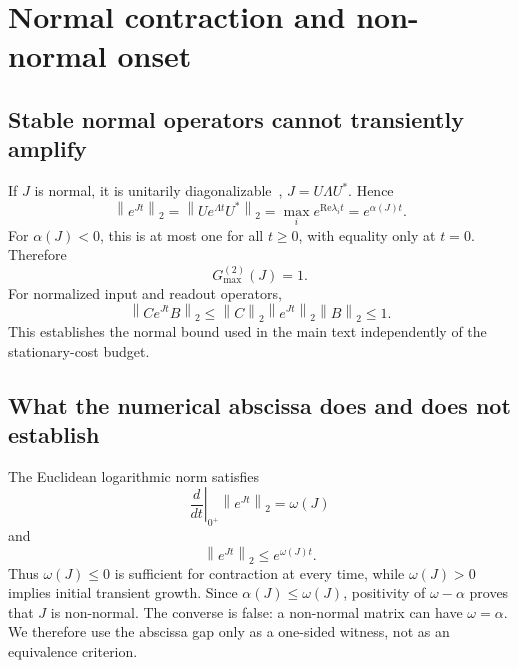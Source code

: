 \documentclass[
  aps,prl,preprint,notitlepage,superscriptaddress,nofootinbib,longbibliography,
  amsmath,amssymb
]{revtex4-2}
\newcommand{\Rey}{\mathrm{Re}}
\newcommand{\Gmax}{G_{\max}^{(2)}}
\newcommand{\opnorm}[1]{\left\lVert #1\right\rVert_2}
\begin{document}
\section{Normal contraction and non-normal onset}
\label{sec:s-normal}

\subsection{Stable normal operators cannot transiently amplify}

If $J$ is normal, it is unitarily diagonalizable~\cite{trefethen2005},
$J=U\Lambda U^\ast$. Hence
\begin{equation}
\opnorm{e^{Jt}}
=\opnorm{Ue^{\Lambda t}U^\ast}
=\max_i e^{\Rey\lambda_i t}
=e^{\alpha(J)t}.
\end{equation}
For $\alpha(J)<0$, this is at most one for all $t\ge0$, with equality only
at $t=0$. Therefore
\begin{equation}
\Gmax(J)=1.
\end{equation}
For normalized input and readout operators,
\begin{equation}
\opnorm{Ce^{Jt}B}
\le\opnorm{C}\opnorm{e^{Jt}}\opnorm{B}
\le1.
\end{equation}
This establishes the normal bound used in the main text independently of the
stationary-cost budget.

\subsection{What the numerical abscissa does and does not establish}

The Euclidean logarithmic norm satisfies
\begin{equation}
\left.\frac{d}{dt}\right|_{0^+}\opnorm{e^{Jt}}=\omega(J)
\end{equation}
and
\begin{equation}
\opnorm{e^{Jt}}\le e^{\omega(J)t}.
\end{equation}
Thus $\omega(J)\le0$ is sufficient for contraction at every time, while
$\omega(J)>0$ implies initial transient growth. Since
$\alpha(J)\le\omega(J)$, positivity of $\omega-\alpha$ proves that $J$ is
non-normal. The converse is false: a non-normal matrix can have
$\omega=\alpha$. We therefore use the abscissa gap only as a one-sided witness,
not as an equivalence criterion.

\end{document}
